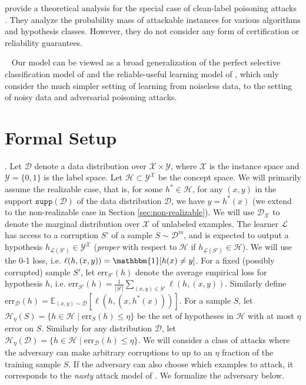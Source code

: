 \documentclass[11pt]{article}
\newcommand{\err}{\mathrm{err}}
\newcommand{\0}{\mathbf{0}}
\newcommand{\1}{\mathbf{1}}
\newcommand{\cD}{\mathcal{D}}
\newcommand{\cH}{\mathcal{H}}
\newcommand{\cL}{\mathcal{L}}
\newcommand{\cY}{\mathcal{Y}}
\newcommand{\cX}{\mathcal{X}}
\newcommand{\bbE}{\mathbb{E}}
\begin{document}
\cite{blum2021robust} provide a theoretical analysis for the special case of clean-label poisoning attacks \citep{shafahi2018poison,suciu2018does}. They  analyze the probability mass of attackable instances for various algorithms and hypothesis classes.  However, they do not consider any form of certification or reliability guarantees.


\smallskip
{}~
Our model can be viewed as a broad generalization of the perfect selective classification model of \cite{el2012active} and the reliable-useful learning model of \cite{rivest1988learning}, which only consider the much simpler setting of learning from noiseless data, to the setting of noisy data and adversarial poisoning attacks.

\section{Formal Setup}

.  Let $\cD$ denote a data distribution over $\cX\times\cY$, where $\cX$ is the instance space and $\cY=\{0,1\}$ is the label space. Let $\cH\subset \cY^{\cX}$ be the concept space. We will primarily assume the realizable case, that is, for some $h^*\in\cH$, for any $(x,y)$ in the support $\texttt{supp}(\cD)$ of the data distribution $\cD$, we have $y=h^*(x)$ (we extend to the non-realizable case in Section \ref{sec:non-realizable}). We will use $\cD_\cX$ to denote the marginal distribution over $\cX$ of unlabeled examples. The learner $\cL$ has access to a corruption $S'$ of a sample $S\sim \cD^m$,
and is expected to output a hypothesis $h_{\cL(S')}\in \cY^{\cX}$ ({\it proper} with respect to $\cH$ if $h_{\cL(S')}\in\cH$).  We will use the 0-1 loss, i.e. $\ell(h,(x,y))=\mathbbm{1}[h(x)\ne y]$.  For a fixed (possibly corrupted) sample $S'$, let $\err_{S'}(h)$ denote the average empirical loss for hypothesis $h$, i.e. $\err_{S'}(h)=\frac{1}{|S'|}\sum_{(x,y)\in S'}\ell(h,(x,y))$. Similarly define $\err_\cD(h)=\bbE_{(x,y)\sim \cD}[\ell(h,(x,h^*(x)))]$. For a sample $S$, let  $\cH_\eta(S)=\{h \in \cH\mid \err_{S}(h)\le\eta\}$ be the set of hypotheses in $\cH$ with at most $\eta$ error on $S$. Similarly for any distribution $\cD$, let $\cH_\eta(\cD)=\{h \in \cH\mid \err_{\cD}(h)\le\eta\}$.
We will consider a class of attacks where the adversary can make arbitrary corruptions to up to an $\eta$ fraction of the training sample $S$. If the adversary can also choose which examples to attack, it corresponds to the {\it nasty} attack model of \cite{bshouty2002pac}.
We formalize the adversary below.
\end{document}

